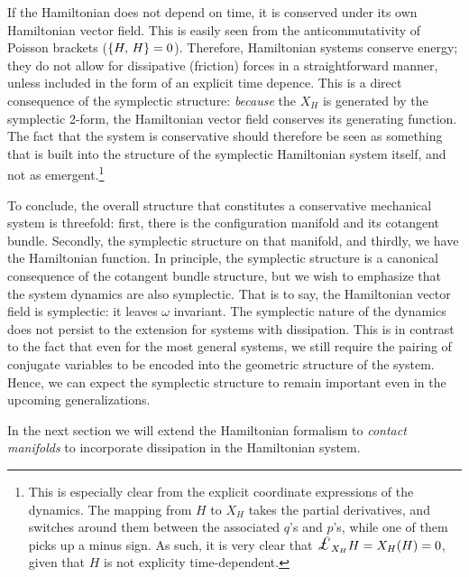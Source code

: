 If the Hamiltonian does not depend on time, it is conserved under its own Hamiltonian vector field. This is easily seen from the anticommutativity of Poisson brackets (\(\qty{H,\,H} = 0\)). Therefore, Hamiltonian systems conserve energy; they do not allow for dissipative (friction) forces in a straightforward manner, unless included in the form of an explicit time depence. This is a direct consequence of the symplectic structure: \emph{because} the \(X_H\) is generated by the symplectic 2-form, the Hamiltonian vector field conserves its generating function. The fact that the system is conservative should therefore be seen as something that is built into the structure of the symplectic Hamiltonian system itself, and not as emergent.\footnote{This is especially clear from the explicit coordinate expressions of the dynamics. The mapping from \(H\) to \(X_H\) takes the partial derivatives, and switches around them between the associated \(q\)'s and \(p\)'s, while one of them picks up a minus sign. As such, it is very clear that \(\lied{X_H}{H} = X_H(H) = 0\), given that \(H\) is not explicity time-dependent.}

To conclude, the overall structure that constitutes a conservative mechanical system is threefold: first, there is the configuration manifold and its cotangent bundle. Secondly, the symplectic structure on that manifold, and thirdly, we have the Hamiltonian function. In principle, the symplectic structure is a canonical consequence of the cotangent bundle structure, but we wish to emphasize that the system dynamics are also symplectic. That is to say, the Hamiltonian vector field is symplectic: it leaves \(\omega\) invariant. The symplectic nature of the dynamics does not persist to the extension for systems with dissipation. This is in contrast to the fact that even for the most general systems, we still require the pairing of conjugate variables to be encoded into the geometric structure of the system. Hence, we can expect the symplectic structure to remain important even in the upcoming generalizations.

In the next section we will extend the Hamiltonian formalism to \emph{contact manifolds} to incorporate dissipation in the Hamiltonian system.
